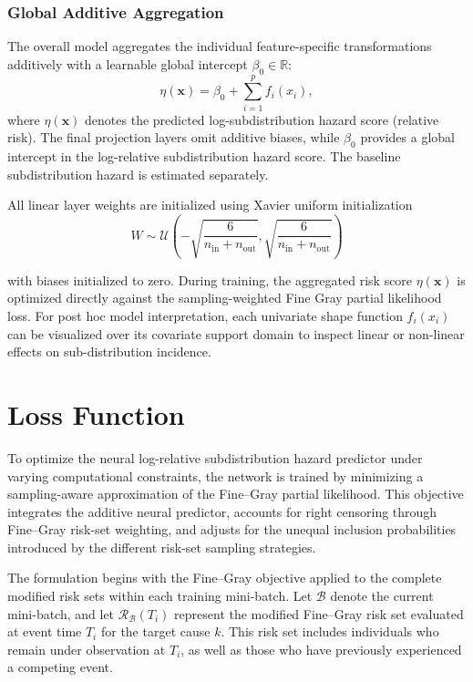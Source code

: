 \documentclass[a4paper,twoside,12pt]{report}
\begin{document}
\subsubsection{Global Additive Aggregation}
The overall model aggregates the individual feature-specific transformations additively with a learnable global intercept $\beta_0 \in \mathbb{R}$:
\begin{equation}
    \eta(\mathbf{x}) = \beta_0 + \sum_{i=1}^p f_i(x_i),
\end{equation}
where $\eta(\mathbf{x})$ denotes the predicted log-subdistribution hazard score (relative risk). The final projection layers omit additive biases, while $\beta_0$ provides a global intercept in the log-relative subdistribution hazard score. The baseline subdistribution hazard is estimated separately.

All linear layer weights are initialized using Xavier uniform initialization 
\begin{equation}
    W \sim \mathcal{U}\left(-\sqrt{\frac{6}{n_{\text{in}} + n_{\text{out}}}}, \sqrt{\frac{6}{n_{\text{in}} + n_{\text{out}}}}\right)
\end{equation}

with biases initialized to zero. During training, the aggregated risk score $\eta(\mathbf{x})$ is optimized directly against the sampling-weighted Fine Gray partial likelihood loss. For post hoc model interpretation, each univariate shape function $f_i(x_i)$ can be visualized over its covariate support domain to inspect linear or non-linear effects on sub-distribution incidence.


\section{Loss Function}

To optimize the neural log-relative subdistribution hazard predictor under varying computational constraints, the network is trained by minimizing a sampling-aware approximation of the Fine--Gray partial likelihood. This objective integrates the additive neural predictor, accounts for right censoring through Fine--Gray risk-set weighting, and adjusts for the unequal inclusion probabilities introduced by the different risk-set sampling strategies.

The formulation begins with the Fine--Gray objective applied to the complete modified risk sets within each training mini-batch. Let $\mathcal{B}$ denote the current mini-batch, and let $\mathcal{R}_{\mathcal{B}}(T_i)$ represent the modified Fine--Gray risk set evaluated at event time $T_i$ for the target cause $k$. This risk set includes individuals who remain under observation at $T_i$, as well as those who have previously experienced a competing event.
\end{document}
